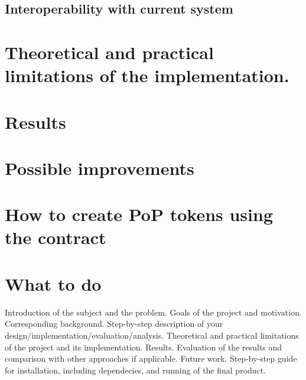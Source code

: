 \documentclass[11pt, a4paper, twoside, openright]{book} %
\begin{document}
\subsection{Interoperability with current system}


\section{Theoretical and practical limitations of the implementation.}
\section{Results}
\section{Possible improvements}
\section{How to create PoP tokens using the contract}

 


\section{What to do}


Introduction of the subject and the problem.
Goals of the project and motivation.
Corresponding background.
Step-by-step description of your design/implementation/evaluation/analysis.
Theoretical and practical limitations of the project and its implementation.
Results.
Evaluation of the results and comparison with other approaches if applicable.
Future work.
Step-by-step guide for installation, including dependecies, and running of the final product.
\end{document}
